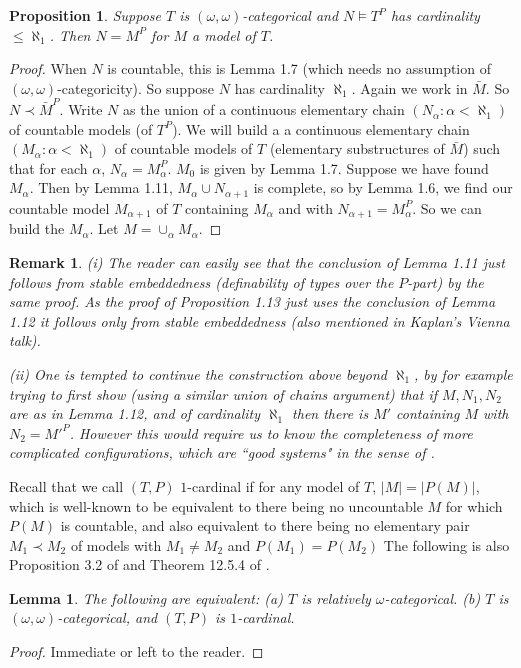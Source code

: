\documentclass[12pt]{article}
\newtheorem{Proposition}[Theorem]{Proposition}
\newtheorem{Remark}[Theorem]{Remark}
\newtheorem{Lemma}[Theorem]{Lemma}
\begin{document}
\begin{Proposition} Suppose $T$ is $(\omega, \omega)$-categorical and $N\models T^{P}$ has cardinality $\leq \aleph_{1}$. Then $N = M^{P}$ for $M$ a model of $T$. 
\end{Proposition}
\begin{proof}
When $N$ is countable, this is Lemma 1.7 (which needs no assumption of $(\omega, \omega)$-categoricity).
So suppose $N$ has cardinality $\aleph_{1}$.  Again we work in ${\bar M}$. So $N\prec {\bar M}^{P}$.
Write $N$ as the union of a continuous elementary chain $(N_{\alpha}: \alpha < \aleph_{1})$ of countable models (of $T^{P}$). 
We will build a a continuous  elementary chain $(M_{\alpha}:\alpha < \aleph_{1})$ of countable models of $T$ (elementary substructures of ${\bar M}$) such that 
for each $\alpha$, $N_{\alpha} = M_{\alpha}^{P}$.  $M_{0}$ is given by Lemma 1.7.
Suppose we have found $M_{\alpha}$. Then by Lemma 1.11,  $M_{\alpha}\cup N_{\alpha + 1}$ is complete, so by Lemma 1.6,  we find our countable model $M_{\alpha+ 1}$ of $T$ containing $M_{\alpha}$ and with $N_{\alpha + 1} = M_{\alpha}^{P}$.   So we can build the $M_{\alpha}$.  Let $M = \cup_{\alpha}M_{\alpha}$.
\end{proof}

\begin{Remark}  (i) The reader can easily see that the conclusion of Lemma  1.11 just follows from stable embeddedness (definability of types over the $P$-part) by the same proof. As the proof of Proposition 1.13 just uses the conclusion of Lemma 1.12 it follows only from stable embeddedness  (also mentioned in Kaplan's Vienna talk). 

(ii) One is tempted to continue the construction above beyond $\aleph_{1}$, by for example trying to first show (using a similar union of chains argument) that if $M, N_{1}, N_{2}$ are as in Lemma 1.12, and of  cardinality $\aleph_{1}$ then there is $M'$ containing $M$ with $N_{2} = M'^{P}$. However this would require us to know the completeness of more complicated configurations, which are ``good systems" in the sense of \cite{S-U}. 
\end{Remark}

Recall that we call $(T,P)$ $1$-cardinal if for any model of $T$, $|M| = |P(M)|$,  which is well-known to be equivalent to there being no uncountable $M$ for which $P(M)$ is countable, and also equivalent to  there being no elementary pair $M_{1}\prec M_{2}$ of models with $M_{1}\neq M_{2}$ and $P(M_{1}) = P(M_{2})$
The following is also Proposition 3.2 of \cite{HHM} and Theorem 12.5.4 of \cite{Hodges-book}. 
\begin{Lemma} The following are equivalent:
\newline
(a) $T$ is relatively $\omega$-categorical.
\newline
(b) $T$ is $(\omega, \omega)$-categorical, and $(T,P)$ is $1$-cardinal.
\end{Lemma}
\begin{proof} Immediate or left to the reader. 
\end{proof}
\end{document}
